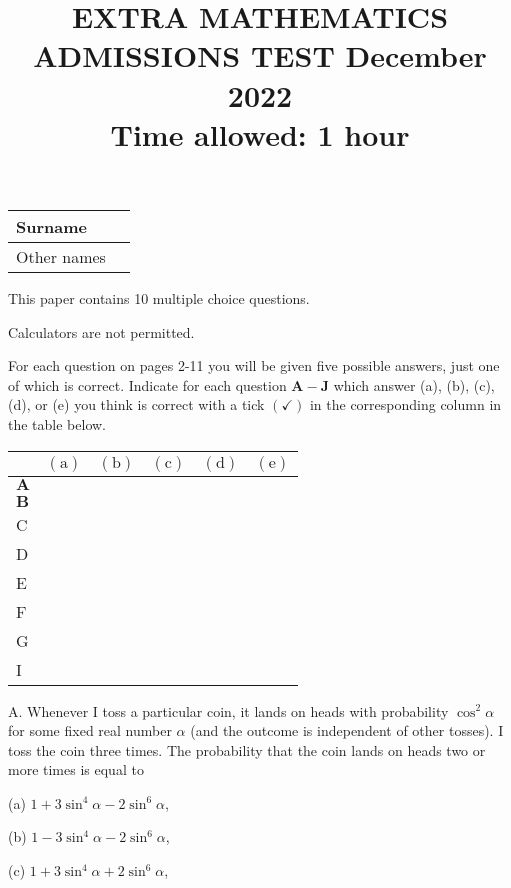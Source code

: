 \documentclass[10pt]{article}
\title{EXTRA MATHEMATICS ADMISSIONS TEST December 2022 \\
 Time allowed: 1 hour }
\author{}
\date{}
\begin{document}
\maketitle
\begin{center}
\begin{tabular}{|l|l|}
\hline
Surname &  \\
\hline
Other names &  \\
\hline
\end{tabular}
\end{center}

This paper contains 10 multiple choice questions.

Calculators are not permitted.

For each question on pages 2-11 you will be given five possible answers, just one of which is correct. Indicate for each question $\mathbf{A}-\mathbf{J}$ which answer (a), (b), (c), (d), or (e) you think is correct with a tick $(\checkmark)$ in the corresponding column in the table below.

\begin{center}
\begin{tabular}{|l|l|l|l|l|l|}
\hline
 & $(\mathrm{a})$ & $(\mathrm{b})$ & $(\mathrm{c})$ & $(\mathrm{d})$ & $(\mathrm{e})$ \\
\hline
$\mathbf{A}$ &  &  &  &  &  \\
\hline
$\mathbf{B}$ &  &  &  &  &  \\
\hline
C &  &  &  &  &  \\
\hline
D &  &  &  &  &  \\
\hline
E &  &  &  &  &  \\
\hline
F &  &  &  &  &  \\
\hline
G &  &  &  &  &  \\
\hline
I &  &  &  &  &  \\
\hline
\end{tabular}
\end{center}

A. Whenever I toss a particular coin, it lands on heads with probability $\cos ^{2} \alpha$ for some fixed real number $\alpha$ (and the outcome is independent of other tosses). I toss the coin three times. The probability that the coin lands on heads two or more times is equal to

(a) $1+3 \sin ^{4} \alpha-2 \sin ^{6} \alpha$,

(b) $1-3 \sin ^{4} \alpha-2 \sin ^{6} \alpha$,

(c) $1+3 \sin ^{4} \alpha+2 \sin ^{6} \alpha$,
\end{document}
